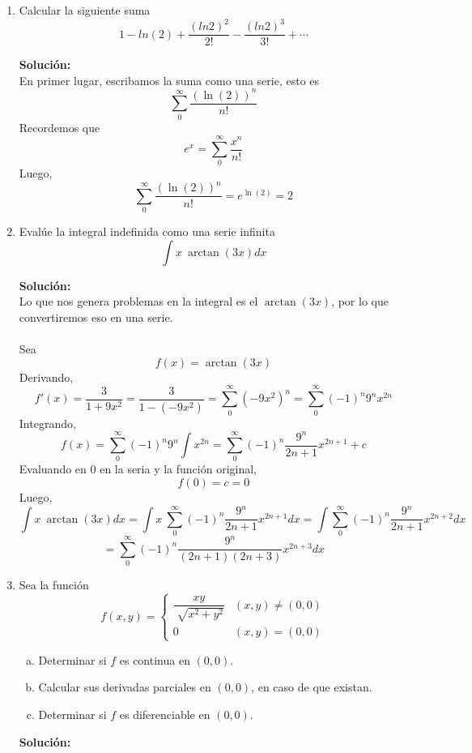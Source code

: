\documentclass[12pt]{article}
\newenvironment{solucion}
{\begin{mdframed}[backgroundcolor=black!10]
		{\bf Solución:}\\
	}
	{
	\end{mdframed}
}
\newenvironment{preguntas}
{\begin{enumerate}\itemsep12pt
	}
	{
	\end{enumerate}
}
\begin{document}
\begin{preguntas}
\item Calcular la siguiente suma
	$$1 - ln(2) + \dfrac{(ln2)^2}{2!}-\dfrac{(ln2)^3}{3!}+\cdots$$
\begin{solucion}
En primer lugar, escribamos la suma como una serie, esto es
$$\sum\limits_{0}^{\infty} \dfrac{(\ln(2))^n}{n!}$$
Recordemos que
$$e^x = \sum\limits_{0}^{\infty} \dfrac{x^n}{n!}$$
Luego,
$$\sum\limits_{0}^{\infty} \dfrac{(\ln(2))^n}{n!} = e^{\ln(2)} = 2$$
\end{solucion}
\item Evalúe la integral indefinida como una serie infinita
	$$\int x\ \arctan(3x)dx$$
\begin{solucion}
Lo que nos genera problemas en la integral es el $\arctan(3x)$, por lo que convertiremos eso en una serie.\\
\\
Sea
$$f(x) = \arctan(3x)$$
Derivando,
$$f'(x) = \dfrac{3}{1+9x^2} = \dfrac{3}{1-(-9x^2)} = \sum\limits_0^{\infty}(-9x^2)^n = \sum\limits_0^{\infty}(-1)^n 9^n x^{2n}$$
Integrando,
$$f(x) = \sum\limits_0^{\infty}(-1)^n 9^n \int x^{2n} = \sum\limits_0^{\infty}(-1)^n \dfrac{9^n}{2n+1}x^{2n+1} + c$$
Evaluando en 0 en la seria y la función original,
$$f(0) = c = 0$$
Luego,
$$\int x\ \arctan(3x)dx
= \int x\ \sum\limits_0^{\infty}(-1)^n \dfrac{9^n}{2n+1}x^{2n+1}dx
= \int \sum\limits_0^{\infty}(-1)^n \dfrac{9^n}{2n+1}x^{2n+2}dx
$$
$$
= \sum\limits_0^{\infty}(-1)^n \dfrac{9^n}{(2n+1)(2n+3)}x^{2n+3}dx
$$
\end{solucion}
\item Sea la función
	$$f(x,y)=
	\begin{cases}
	\dfrac{xy}{\sqrt[]{x^2+y^2}} & (x,y) \neq (0,0)\\
	0 & (x,y)=(0,0)
	\end{cases}
	$$
\begin{enumerate}[a)]
\item Determinar si $f$ es continua en $(0,0)$.
\item Calcular sus derivadas parciales en $(0,0)$, en caso de que existan.
\item Determinar si $f$ es diferenciable en $(0,0)$.
\end{enumerate}
\begin{solucion}


\end{solucion}
\end{preguntas}
\end{document}
